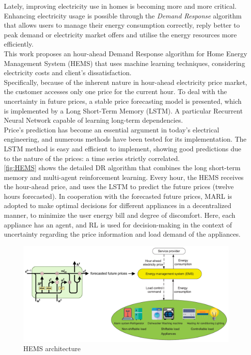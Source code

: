 Lately, improving electricity use in homes is becoming more and more critical. Enhancing electricity usage is possible through the \textit{Demand Response} algorithm that allows users to manage their energy consumption correctly, reply better to peak demand or electricity market offers and utilise the energy resources more efficiently.\\
This work proposes an hour-ahead Demand Response algorithm for Home Energy Management System (HEMS) that uses machine learning techniques, considering electricity costs and client's dissatisfaction. \\
Specifically, because of the inherent nature in hour-ahead electricity price market, the customer accesses only one price for the current hour. To deal with the uncertainty in future prices, a stable price forecasting model is presented, which is implemented by a Long Short-Term Memory (LSTM). A particular Recurrent Neural Network capable of learning long-term dependencies.\\
Price's prediction has become an essential argument in today's electrical engineering, and numerous methods have been tested for its implementation. The LSTM method is easy and efficient to implement, showing good predictions due to the nature of the prices: a time series strictly correlated. \\
\autoref{fig:HEMS} shows the detailed DR algorithm that combines the long short-term memory and multi-agent reinforcement learning. Every hour, the HEMS receives the hour-ahead price, and uses the LSTM to predict the future prices (twelve hours forecasted). In cooperation with the forecasted future prices, MARL is adopted to make optimal decisions for different appliances in a decentralized manner, to minimize the user energy bill and degree of discomfort. Here, each appliance has an agent, and RL is used for decision-making in the context of uncertainty regarding the price information and load demand of the appliances.

\begin{figure}[h]
    \centering
    \includegraphics[width=\textwidth]{HEMS.png}
    \caption{HEMS architecture}
    \label{fig:HEMS}
\end{figure}